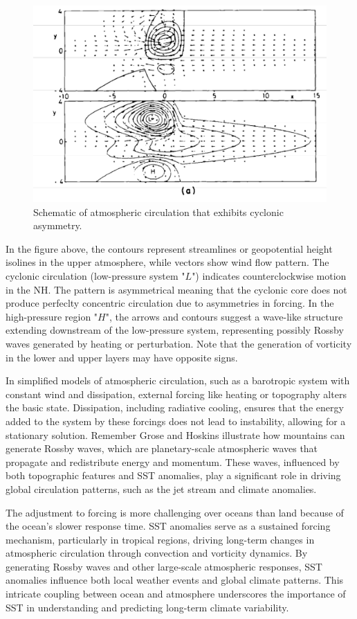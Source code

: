 \begin{figure}[htp!]
	\centering
	\includegraphics[width=0.4\linewidth]{uploads/Screenshot 2024-11-26 100719.png}
	\caption{Schematic of atmospheric circulation that exhibits cyclonic asymmetry.}
	\label{fig:enter-label}
\end{figure}



In the figure above, the contours represent streamlines or geopotential height isolines in the upper atmosphere, while vectors show wind flow pattern. The cyclonic circulation (low-pressure system "$L$") indicates counterclockwise motion in the NH. The pattern is asymmetrical meaning that the cyclonic core does not produce perfeclty concentric circulation due to asymmetries in forcing. In the high-pressure region "$H$", the arrows and contours suggest a wave-like structure extending downstream of the low-pressure system, representing possibly Rossby waves generated by heating or perturbation. Note that the generation of vorticity in the lower and upper layers may have opposite signs.



In simplified models of atmospheric circulation, such as a barotropic system with constant wind and dissipation, external forcing like heating or topography alters the basic state. Dissipation, including radiative cooling, ensures that the energy added to the system by these forcings does not lead to instability, allowing for a stationary solution. Remember Grose and Hoskins illustrate how mountains can generate Rossby waves, which are planetary-scale atmospheric waves that propagate and redistribute energy and momentum. These waves, influenced by both topographic features and SST anomalies, play a significant role in driving global circulation patterns, such as the jet stream and climate anomalies.

The adjustment to forcing is more challenging over oceans than land because of the ocean’s slower response time. SST anomalies serve as a sustained forcing mechanism, particularly in tropical regions, driving long-term changes in atmospheric circulation through convection and vorticity dynamics. By generating Rossby waves and other large-scale atmospheric responses, SST anomalies influence both local weather events and global climate patterns. This intricate coupling between ocean and atmosphere underscores the importance of SST in understanding and predicting long-term climate variability.\\[0.25 cm]

